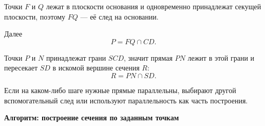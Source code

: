 \documentclass[a4paper,12pt]{article}
\begin{document}
Точки $F$ и $Q$
лежат в плоскости основания
и одновременно принадлежат секущей плоскости,
поэтому $FQ$ --- её след на основании.

Далее
\[
P=FQ\cap CD.
\]

Точки $P$ и $N$
принадлежат грани $SCD$,
значит прямая $PN$
лежит в этой грани
и пересекает $SD$
в искомой вершине сечения $R$:
\[
R=PN\cap SD.
\]

Если на каком-либо шаге
нужные прямые параллельны,
выбирают другой вспомогательный след
или используют параллельность
как часть построения.


\clearpage
\thispagestyle{empty}

\begin{center}
{\Large\bfseries\textcolor{darkaccent}{
Алгоритм: построение сечения по заданным точкам
}}
\end{center}

\vspace{3mm}
\end{document}
